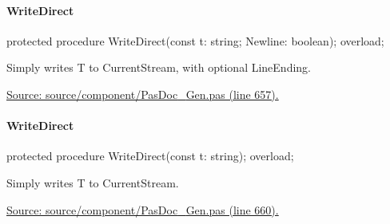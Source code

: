 \documentclass{report}
\newif\ifpdf
\begin{document}
\paragraph*{WriteDirect}\hspace*{\fill}

\label{PasDoc_Gen.TDocGenerator-WriteDirect}
\begin{list}{}{
\setlength{\itemindent}{0cm}
\setlength{\listparindent}{0cm}
\setlength{\leftmargin}{\evensidemargin}
\addtolength{\leftmargin}{\tmplength}
\settowidth{\labelsep}{X}
\addtolength{\leftmargin}{\labelsep}
\setlength{\labelwidth}{\tmplength}
}
\item[\textbf{Declaration}\hfill]
\ifpdf
\begin{flushleft}
\fi
\begin{ttfamily}
protected procedure WriteDirect(const t: string; Newline: boolean); overload;\end{ttfamily}

\ifpdf
\end{flushleft}
\fi

\par
\item[\textbf{Description}]
Simply writes T to CurrentStream, with optional LineEnding.\par
\href{https://github.com/pasdoc/pasdoc/blob/master/source/component/PasDoc_Gen.pas#L657}{Source: source/component/PasDoc{\_}Gen.pas (line 657).}

\end{list}
\paragraph*{WriteDirect}\hspace*{\fill}

\label{PasDoc_Gen.TDocGenerator-WriteDirect}
\begin{list}{}{
\setlength{\itemindent}{0cm}
\setlength{\listparindent}{0cm}
\setlength{\leftmargin}{\evensidemargin}
\addtolength{\leftmargin}{\tmplength}
\settowidth{\labelsep}{X}
\addtolength{\leftmargin}{\labelsep}
\setlength{\labelwidth}{\tmplength}
}
\item[\textbf{Declaration}\hfill]
\ifpdf
\begin{flushleft}
\fi
\begin{ttfamily}
protected procedure WriteDirect(const t: string); overload;\end{ttfamily}

\ifpdf
\end{flushleft}
\fi

\par
\item[\textbf{Description}]
Simply writes T to CurrentStream.\par
\href{https://github.com/pasdoc/pasdoc/blob/master/source/component/PasDoc_Gen.pas#L660}{Source: source/component/PasDoc{\_}Gen.pas (line 660).}

\end{list}
\end{document}
